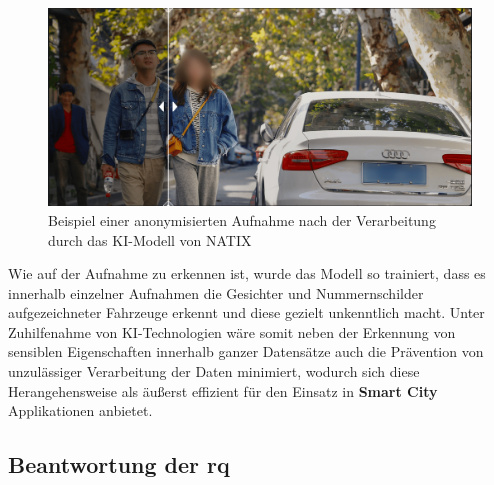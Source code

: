 \begin{figure}
    \centering
    \includegraphics[width=\textwidth]{main/pictures/countermeasures/Anonymized_Footage}
    \caption{Beispiel einer anonymisierten Aufnahme nach der Verarbeitung durch das KI-Modell von NATIX \cite{Natix2022}}
    \label{fig:anonymized-footage}
\end{figure}

Wie auf der Aufnahme zu erkennen ist, wurde das Modell so trainiert, dass es innerhalb einzelner Aufnahmen die Gesichter und Nummernschilder aufgezeichneter Fahrzeuge erkennt und diese gezielt unkenntlich macht. Unter Zuhilfenahme von KI-Technologien wäre somit neben der Erkennung von sensiblen Eigenschaften innerhalb ganzer Datensätze auch die Prävention von unzulässiger Verarbeitung der Daten minimiert, wodurch sich diese Herangehensweise als äußerst effizient für den Einsatz in \textbf{Smart City} Applikationen anbietet.


\subsection{Beantwortung der \acl{rq}}
\label{sec:Hauptteil:ssec:Beantwortung der wissenschaftlichen Fragen}

